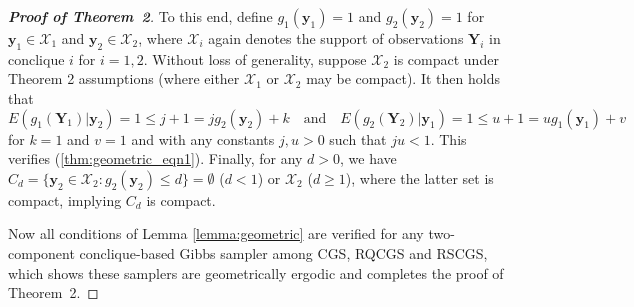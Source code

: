 \documentclass[12pt]{article}
\theoremstyle{definition}
\begin{document}
\begin{proof}[\bf Proof of Theorem~2]
To this end, define $g_{1}(\boldsymbol y_1) = 1$ and $g_{2}(\boldsymbol y_2) = 1$ for $\boldsymbol y_1 \in \mathcal{X}_1$ and $\boldsymbol y_2 \in \mathcal{X}_2$, where $\mathcal{X}_i$  again denotes the support of  observations   $\boldsymbol Y_i$ in conclique $i$ for $ i= 1,2$. Without loss of generality, suppose $\mathcal{X}_2$ is compact under Theorem 2 assumptions (where either $\mathcal{X}_1$ or $\mathcal{X}_2$ may be compact).  It then holds that
$$
E(g_{1}(\boldsymbol Y_1)|\boldsymbol y_2) = 1  \le j + 1 = jg_2(\boldsymbol y_2) + k \quad \text{and} \quad E(g_{2}(\boldsymbol Y_2)|\boldsymbol y_1) = 1  \le u + 1 = u g_1(\boldsymbol y_1) + v
$$
for $k = 1$ and $v = 1$ and with any constants $j,u > 0$ such that $ju < 1$. This verifies (\ref{thm:geometric_eqn1}). Finally, for any $d > 0$,
we have $C_d = \{\boldsymbol y_2 \in \mathcal{X}_2 : g_{2}(\boldsymbol y_2) \le d\} = \emptyset$ ($d<1$) or $\mathcal{X}_2$ ($d \geq 1$), where the latter set is compact, implying  $C_d$ is compact.

Now  all conditions of Lemma \ref{lemma:geometric} are verified for any two-component conclique-based Gibbs sampler among CGS, RQCGS  and RSCGS, which shows these  samplers are geometrically ergodic and completes the proof of Theorem~2.
 \end{proof}
\end{document}

